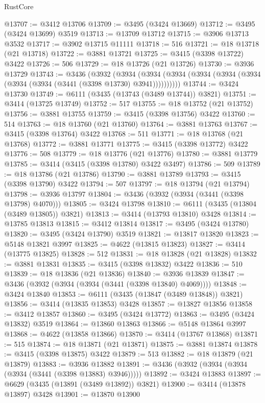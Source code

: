 \begin{lexlean}{RustCore}
\begin{coremodule}
@13707 := @3412 @13706
@13709 := @3495 (@3424 @13669)
@13712 := @3495 (@3424 @13699) @3519
@13713 := @13709 @13712
@13715 := @3906 @13713 @3532
@13717 := @3902 @13715 @11111
@13718 := 516
@13721 := @18 @13718 (@21 @13718)
@13722 := @3881 @13721
@13725 := @3415 (@3398 @13722) @3422
@13726 := 506
@13729 := @18 @13726 (@21 @13726)
@13730 := @3936 @13729
@13743 := @3436
    (@3932
      (@3934 (@3934 (@3934 (@3934 (@3934 (@3934 (@3934 (@3934 (@3441 (@3398 @13730) @3941))))))))))
@13744 := @3424 @13730
@13749 := @6111 (@3435 (@13743 (@3489 @13744)) @3821)
@13751 := @3414 (@13725 @13749)
@13752 := 517
@13755 := @18 @13752 (@21 @13752)
@13756 := @3881 @13755
@13759 := @3415 (@3398 @13756) @3422
@13760 := 514
@13763 := @18 @13760 (@21 @13760)
@13764 := @3881 @13763
@13767 := @3415 (@3398 @13764) @3422
@13768 := 511
@13771 := @18 @13768 (@21 @13768)
@13772 := @3881 @13771
@13775 := @3415 (@3398 @13772) @3422
@13776 := 508
@13779 := @18 @13776 (@21 @13776)
@13780 := @3881 @13779
@13785 := @3414 (@3415 (@3398 @13780) @3422 @3497)
@13786 := 509
@13789 := @18 @13786 (@21 @13786)
@13790 := @3881 @13789
@13793 := @3415 (@3398 @13790) @3422
@13794 := 507
@13797 := @18 @13794 (@21 @13794)
@13798 := @3936 @13797
@13804 := @3436 (@3932 (@3934 (@3441 (@3398 @13798) @4070)))
@13805 := @3424 @13798
@13810 := @6111 (@3435 (@13804 (@3489 @13805)) @3821)
@13813 := @3414 (@13793 @13810) @3428
@13814 := @13785 @13813
@13815 := @3412 @13814
@13817 := @3495 (@3424 @13780)
@13820 := @3495 (@3424 @13790) @3519
@13821 := @13817 @13820
@13823 := @5148 @13821 @3997
@13825 := @4622 (@13815 @13823)
@13827 := @3414 (@13775 @13825)
@13828 := 512
@13831 := @18 @13828 (@21 @13828)
@13832 := @3881 @13831
@13835 := @3415 (@3398 @13832) @3422
@13836 := 510
@13839 := @18 @13836 (@21 @13836)
@13840 := @3936 @13839
@13847 := @3436 (@3932 (@3934 (@3934 (@3441 (@3398 @13840) @4069))))
@13848 := @3424 @13840
@13853 := @6111 (@3435 (@13847 (@3489 @13848)) @3821)
@13856 := @3414 (@13835 @13853) @3428
@13857 := @13827 @13856
@13858 := @3412 @13857
@13860 := @3495 (@3424 @13772)
@13863 := @3495 (@3424 @13832) @3519
@13864 := @13860 @13863
@13866 := @5148 @13864 @3997
@13868 := @4622 (@13858 @13866)
@13870 := @3414 (@13767 @13868)
@13871 := 515
@13874 := @18 @13871 (@21 @13871)
@13875 := @3881 @13874
@13878 := @3415 (@3398 @13875) @3422
@13879 := 513
@13882 := @18 @13879 (@21 @13879)
@13883 := @3936 @13882
@13891 := @3436 (@3932 (@3934 (@3934 (@3934 (@3441 (@3398 @13883) @3946)))))
@13892 := @3424 @13883
@13897 := @6629 (@3435 (@13891 (@3489 @13892)) @3821)
@13900 := @3414 (@13878 @13897) @3428
@13901 := @13870 @13900

\end{coremodule}
\end{lexlean}
